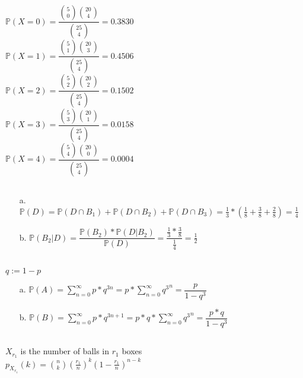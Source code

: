 \documentclass{article}
\begin{document}
\subsection{}
$\mathbb{P}(X=0) = \dfrac{\binom{5}{0}\binom{20}{4}}{\binom{25}{4}} = 0.3830$ \\
$\mathbb{P}(X=1) = \dfrac{\binom{5}{1}\binom{20}{3}}{\binom{25}{4}} = 0.4506$ \\
$\mathbb{P}(X=2) = \dfrac{\binom{5}{2}\binom{20}{2}}{\binom{25}{4}} = 0.1502$ \\
$\mathbb{P}(X=3) = \dfrac{\binom{5}{3}\binom{20}{1}}{\binom{25}{4}} = 0.0158$ \\
$\mathbb{P}(X=4) = \dfrac{\binom{5}{4}\binom{20}{0}}{\binom{25}{4}} = 0.0004$

\subsection{}

\begin{enumerate}
	\item[a.] $\mathbb{P}(D) = \mathbb{P}(D \cap B_1) + \mathbb{P}(D \cap B_2) + \mathbb{P}(D \cap B_3)
	                         = \frac{1}{3} * (\frac{1}{8} + \frac{3}{8} + \frac{2}{8}) = \frac{1}{4}$
	\item[b.] $\mathbb{P}(B_2 | D) = \dfrac{\mathbb{P}(B_2) * \mathbb{P}(D | B_2)}{\mathbb{P}(D)}
                                   = \dfrac{\frac{1}{3} * \frac{3}{8}}{\frac{1}{4}} = \frac{1}{2}$
\end{enumerate}

\subsection{}
$q := 1 - p$
\begin{enumerate}
	\item[a.] $\mathbb{P}(A) = \sum\limits_{n=0}^{\infty}p * q^{3n} 
                               = p * \sum\limits_{n=0}^{\infty}{q^3}^n 
                               = \dfrac{p}{1 - q^3}$
	\item[b.] $\mathbb{P}(B) = \sum\limits_{n=0}^{\infty}p * q^{3n + 1}
                               = p * q * \sum\limits_{n=0}^{\infty}{q^3}^n
                               = \dfrac{p * q}{1 - q^3}$
\end{enumerate}

\subsection{}
$X_{r_1}$ is the number of balls in $r_1$ boxes \\
$p_{X_{r_1}}(k) = \binom{n}{k}(\frac{r_1}{n})^{k}(1 - \frac{r_1}{n})^{n-k} $
\end{document}
